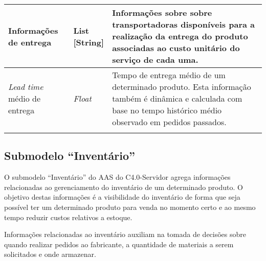 \begin{longtable}{p{} p{} p{}}
	\hline
	Informações de entrega
	 & \makecell{List\\{[String]}}
	 & Informações sobre sobre transportadoras disponíveis para a realização da entrega do produto associadas ao custo unitário do serviço de cada uma.                                                                                                                                                                                                                                                                                                                                                                                                                                                                                                               \\

	\hline
	\textit{Lead time} médio de entrega
	 & \textit{Float}
	 & Tempo de entrega médio de um determinado produto. Esta informação também é dinâmica e calculada com base no tempo histórico médio observado em pedidos passados.                                                                                                                                                                                                                                                                                                                                                                                                                                                                                               \\



	\hline
	\label{tab:submodelo-processos}
\end{longtable}

\subsection{Submodelo ``Inventário''}

O submodelo ``Inventário'' do AAS do C4.0-Servidor agrega informações relacionadas ao gerenciamento do inventário de um determinado produto. O objetivo destas informações é a visibilidade do inventário de forma que seja possível ter um determinado produto para venda no momento certo e ao mesmo tempo reduzir custos relativos a estoque.

Informações relacionadas ao inventário auxiliam na tomada de decisões sobre quando realizar pedidos ao fabricante, a quantidade de materiais a serem solicitados e onde armazenar.

